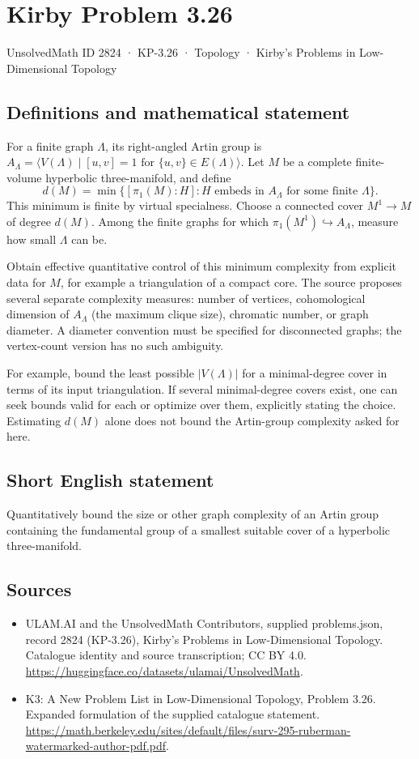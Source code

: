 \documentclass[11pt,a4paper]{article}
\begin{document}
\section*{Kirby Problem 3.26}\label{2824}
{\small UnsolvedMath ID 2824 · KP-3.26 · Topology · Kirby's Problems in Low-Dimensional Topology}
\subsection{Definitions and mathematical statement}
For a finite graph $\Lambda$, its right-angled Artin group is
$A_\Lambda=\langle V(\Lambda)\mid [u,v]=1\text{ for }\{u,v\}\in E(\Lambda)\rangle$.
Let $M$ be a complete finite-volume hyperbolic three-manifold, and define
\[
 d(M)=\min\{[\pi_1(M):H]:H\text{ embeds in }A_\Lambda
                    \text{ for some finite }\Lambda\}.
\]
This minimum is finite by virtual specialness. Choose a connected cover
$M^1\to M$ of degree $d(M)$. Among the finite graphs for which
$\pi_1(M^1)\hookrightarrow A_\Lambda$, measure how small $\Lambda$ can be.

Obtain effective quantitative control of this minimum complexity from
explicit data for $M$, for example a triangulation of a compact core. The
source proposes several separate complexity measures: number of vertices,
cohomological dimension of $A_\Lambda$ (the maximum clique size), chromatic
number, or graph diameter. A diameter convention must be specified for
disconnected graphs; the vertex-count version has no such ambiguity.

For example, bound the least possible $|V(\Lambda)|$ for a minimal-degree
cover in terms of its input triangulation. If several minimal-degree covers
exist, one can seek bounds valid for each or optimize over them, explicitly
stating the choice. Estimating $d(M)$ alone does not bound the Artin-group
complexity asked for here.
\subsection{Short English statement}
Quantitatively bound the size or other graph complexity of an Artin group containing the fundamental group of a smallest suitable cover of a hyperbolic three-manifold.
\subsection{Sources}
\begin{itemize}
\item[S1] ULAM.AI and the UnsolvedMath Contributors, supplied problems.json, record 2824 (KP-3.26), Kirby's Problems in Low-Dimensional Topology. Catalogue identity and source transcription; CC BY 4.0.
\url{https://huggingface.co/datasets/ulamai/UnsolvedMath}.
\item[S2] K3: A New Problem List in Low-Dimensional Topology, Problem 3.26. Expanded formulation of the supplied catalogue statement.
\url{https://math.berkeley.edu/sites/default/files/surv-295-ruberman-watermarked-author-pdf.pdf}.
\end{itemize}
\end{document}
